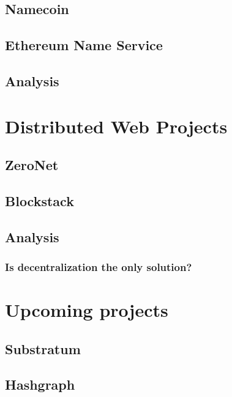 \documentclass[mscthesis]{usiinfthesis}
\begin{document}
\section{Namecoin}\label{proj:namecoin}

\section{Ethereum Name Service}\label{proj:ens}

\section{Analysis}


\chapter{Distributed Web Projects}

\section{ZeroNet}\label{proj:zeronet}

\section{Blockstack}\label{proj:blockstack}

\section{Analysis}

\subsection{Is decentralization the only solution?}


\chapter{Upcoming projects} %

\section{Substratum}

\section{Hashgraph}
\end{document}
